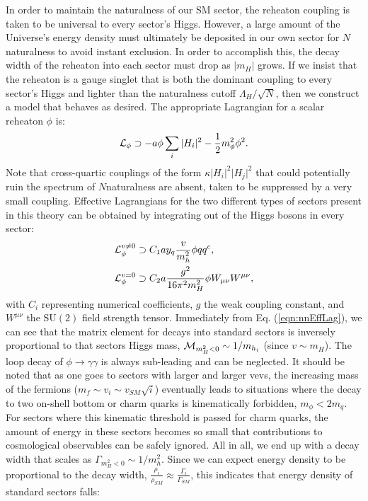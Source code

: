 \documentclass[nofootinbib,twocolumn,preprintnumbers]{revtex4-1}
\begin{document}
In order to maintain the naturalness of our SM sector, the reheaton coupling is taken to be universal to every sector's Higgs. However, a large amount of the Universe's energy density must ultimately be deposited in our own sector for $N$naturalness to avoid instant exclusion. In order to accomplish this, the decay width of the reheaton into each sector must drop as $\vert m_H\vert$ grows. If we insist that the reheaton is a gauge singlet that is both the dominant coupling to every sector's Higgs and lighter than the naturalness cutoff $\Lambda_H/\sqrt{N}$, then we construct a model that behaves as desired. 
The appropriate Lagrangian for a scalar reheaton $\phi$ is: 
\begin{equation}\label{eqn:nnLagrangian}
{\cal L}_\phi \supset -a\phi\sum_i\vert H_i\vert^2 - \frac{1}{2}m^2_\phi \phi^2.
\end{equation}
Note that cross-quartic couplings of the form $\kappa\vert H_i\vert^2\vert H_j\vert^2$ that could potentially ruin the spectrum of $N$naturalness are absent, taken to be suppressed by a very small coupling. Effective Lagrangians for the two different types of sectors present in this theory can be obtained by integrating out of the Higgs bosons in every sector:
\begin{equation}\label{eqn:nnEffLag}
\begin{split}
{\cal L}_\phi^{v \neq 0} &\supset C_1 a y_q\frac{v}{m_h^2}\phi q q^c,
\\
{\cal L}_\phi^{v = 0} &\supset C_2 a \frac{g^2}{16\pi^2 m_H^2}\phi W_{\mu\nu}W^{\mu\nu},
\end{split}
\end{equation}
with $C_i$ representing numerical coefficients, $g$ the weak coupling constant, and $W^{\mu\nu}$ the SU$(2)$ field strength tensor.
Immediately from Eq. (\ref{eqn:nnEffLag}), we can see that the matrix element for decays into standard sectors is inversely proportional to that sectors Higgs mass, ${\cal M}_{m_H^2 < 0} \sim 1/m_{h_i}$ (since $v\sim m_H$). 
The loop decay of $\phi \rightarrow \gamma\gamma$ is always sub-leading and can be neglected. It should be noted that as one goes to sectors with larger and larger vevs, the increasing mass of the fermions ($m_f \sim v_i \sim v_{SM}\sqrt{i}$) eventually leads to situations where the decay to two on-shell bottom or charm quarks is kinematically forbidden, $m_\phi < 2 m_q$. For sectors where this kinematic threshold is passed for charm quarks, the amount of energy in these sectors becomes so small that contributions to cosmological observables can be safely ignored. All in all, we end up with a decay width that scales as $\Gamma_{m_H^2<0} \sim 1/m_h^2$. Since we can expect energy density to be proportional to the decay width, $\frac{\rho_i}{\rho_{SM}} \approx \frac{\Gamma_i}{\Gamma_{SM}}$, this indicates that energy density of standard sectors falls:
\end{document}
